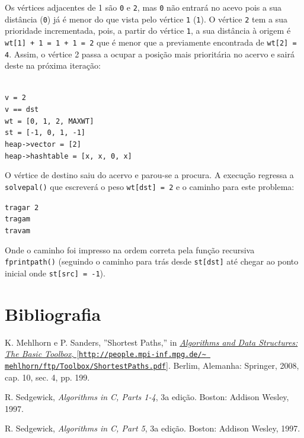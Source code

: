 \documentclass[portuguese, a4paper]{article}
\newcommand\tu[0]{\textunderscore}
\begin{document}
	\par
	Os vértices adjacentes de 1 são \texttt{0} e \texttt{2}, mas \texttt{0} não
	entrará no acevo pois a sua distância (\texttt{0}) já é menor do que vista
	pelo vértice \texttt{1} (\texttt{1}). O vértice \texttt{2} tem a sua
	prioridade incrementada, pois, a partir do vértice \texttt{1}, a sua
	distância à origem é \texttt{wt[1] + 1 = 1 + 1 = 2} que é menor que a
	previamente encontrada de \texttt{wt[2] = 4}. Assim, o vértice 2 passa a
	ocupar a posição mais prioritária no acervo e sairá deste na próxima
	iteração:
	\begin{center}
		\begin{minipage}{0.45\linewidth}
		\texttt{\\
			v = 2 \\
			v == dst \\
			wt = [0, 1, 2, MAX\tu WT] \\
			st = [-1, 0, 1, -1] \\
			heap->vector = [2] \\
			heap->hash\tu table = [x, x, 0, x] \\}
		\end{minipage}
		\hspace{0.05\linewidth}
	\end{center}
	\par
	O vértice de destino saiu do acervo e parou-se a procura. A execução
	regressa a \texttt{solve\tu pal()} que escreverá o peso \texttt{wt[dst] = 2}
	e o caminho para este problema:
	\begin{center}
	\begin{minipage}{0.15\linewidth}
		\texttt{tragar 2 \\
				tragam \\
				travam}
	\end{minipage}
	\end{center}
	\par
	Onde o caminho foi impresso na ordem correta pela função recursiva
	\texttt{fprint\tu path()} (seguindo o caminho para trás desde
	\texttt{st[dst]} até chegar ao ponto inicial onde \texttt{st[src] = -1}).

\section{Bibliografia}
	\begin{thebibliography}{9}
		K. Mehlhorn e P. Sanders, ''Shortest Paths,'' in
		\href{http://people.mpi-inf.mpg.de/~mehlhorn/ftp/Toolbox/ShortestPaths.pdf}{\emph{Algorithms
		and Data Structures: The Basic Toolbox},
		[\texttt{http://people.mpi-inf.mpg.de/\textasciitilde
		mehlhorn/ftp/Toolbox/ShortestPaths.pdf}]}. Berlim, Alemanha: Springer,
		2008, cap. 10, sec. 4, pp. 199.

		R. Sedgewick, \emph{Algorithms in C, Parts 1-4}, 3a edição. Boston:
		Addison Wesley, 1997.

		R. Sedgewick, \emph{Algorithms in C, Part 5}, 3a edição. Boston:
		Addison Wesley, 1997.
	\end{thebibliography}
\end{document}
